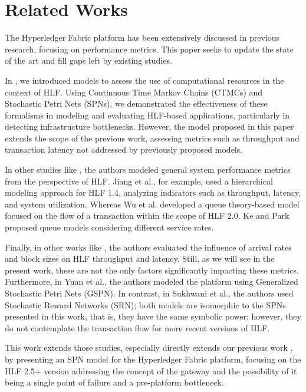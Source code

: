 \section{Related Works}
\label{sec:related}

The Hyperledger Fabric platform has been extensively discussed in previous research, focusing on performance metrics.
This paper seeks to update the state of the art and fill gaps left by existing studies.

In \cite{melo_computing2022}, we introduced models to assess the use of computational resources in the context of HLF.
Using Continuous Time Markov Chains (CTMCs) and Stochastic Petri Nets (SPNs), we demonstrated the effectiveness of these formalisms in modeling and evaluating HLF-based applications, particularly in detecting infrastructure bottlenecks.
However, the model proposed in this paper extends the scope of the previous work, assessing metrics such as throughput and transaction latency not addressed by previously proposed models.

In other studies like \cite{wu_acm_ease2022, jiang2020performance, ke_springer_cc2022}, the authors modeled general system performance metrics from the perspective of HLF.
Jiang et al.\cite{jiang2020performance}, for example, used a hierarchical modeling approach for HLF 1.4, analyzing indicators such as throughput, latency, and system utilization.
Whereas Wu et al.\cite{wu_acm_ease2022} developed a queue theory-based model focused on the flow of a transaction within the scope of HLF 2.0.
Ke and Park~\cite{ke_springer_cc2022} proposed queue models considering different service rates.

Finally, in other works like \cite{sukhwani2018performance, yuan2020performance}, the authors evaluated the influence of arrival rates and block sizes on HLF throughput and latency. Still, as we will see in the present work, these are not the only factors significantly impacting these metrics.
Furthermore, in Yuan et al.\cite{yuan2020performance}, the authors modeled the platform using Generalized Stochastic Petri Nets (GSPN). In contrast, in Sukhwani et al.\cite{sukhwani2018performance}, the authors used Stochastic Reward Networks (SRN); both models are isomorphic to the SPNs presented in this work, that is, they have the same symbolic power; however, they do not contemplate the transaction flow for more recent versions of HLF.

This work extends those studies, especially directly extends our previous work \cite{silva2023avaliaccao}, by presenting an SPN model for the Hyperledger Fabric platform, focusing on the HLF 2.5+ version addressing the concept of the gateway and the possibility of it being a single point of failure and a pre-platform bottleneck.

